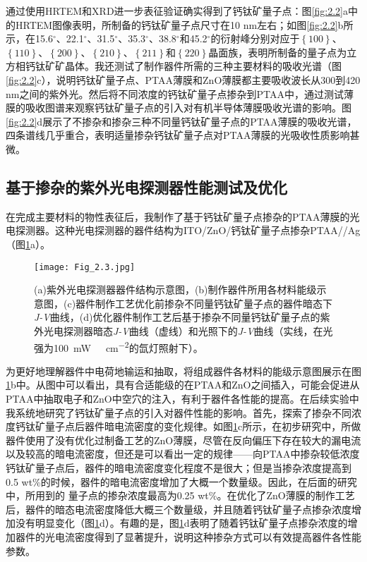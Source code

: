 \documentclass[forlib]{WHUMaster}   %
\def\degree{${}^{\circ}$} %
\begin{document}
{通过使用HRTEM和XRD进一步表征验证确实得到了钙钛矿量子点：图\ref{fig:2.2}a中的HRTEM图像表明，所制备的钙钛矿量子点尺寸在10 nm左右；如图\ref{fig:2.2}b所示，在15.6\degree、22.1\degree、31.5\degree、35.3\degree、38.8\degree 和45.2\degree 的衍射峰分别对应于$\left\{\num{100}\right\}$、$\left\{\num{110}\right\}$、$\left\{\num{200}\right\}$、$\left\{\num{210}\right\}$、$\left\{\num{211}\right\}$和$\left\{\num{220}\right\}$晶面族，表明所制备的量子点为立方相钙钛矿矿晶体\cite{RN33}。我还测试了制作器件所需的三种主要材料的吸收光谱（图\ref{fig:2.2}c），说明钙钛矿量子点、PTAA薄膜和ZnO薄膜都主要吸收波长从300到420 nm之间的紫外光。然后将不同浓度的钙钛矿量子点掺杂到PTAA中，通过测试薄膜的吸收图谱来观察钙钛矿量子点的引入对有机半导体薄膜吸收光谱的影响。图\ref{fig:2.2}d展示了不掺杂和掺杂三种不同量钙钛矿量子点的PTAA薄膜的吸收光谱，四条谱线几乎重合，表明适量掺杂钙钛矿量子点对PTAA薄膜的光吸收性质影响甚微。

\subsection{\texorpdfstring{基于掺杂的紫外光电探测器性能测试及优化}{PDFstring}}%

在完成主要材料的物性表征后，我制作了基于钙钛矿量子点掺杂的PTAA薄膜的光电探测器。这种光电探测器的器件结构为ITO/ZnO/钙钛矿量子点掺杂PTAA//Ag（图\ref{fig:2.3}a）。

\begin{figure}[htb]
\centering
  \texttt{[image: Fig\_2.3.jpg]}
  \caption{\rm (a)紫外光电探测器器件结构示意图，(b)制作器件所用各材料能级示意图，(c)器件制作工艺优化前掺杂不同量钙钛矿量子点的器件暗态下\emph{J-V}曲线，(d)优化器件制作工艺后基于掺杂不同量钙钛矿量子点的紫外光电探测器暗态\emph{J-V}曲线（虚线）和光照下的\emph{J-V}曲线（实线，在光强为100\ \si{mW \ cm^{-2}}的氙灯照射下）。}
  \label{fig:2.3}
\end{figure}

为更好地理解器件中电荷地输运和抽取，将组成器件各材料的能级示意图展示在图\ref{fig:2.3}b中。从图中可以看出，具有合适能级的在PTAA和ZnO之间插入，可能会促进从PTAA中抽取电子和ZnO中空穴的注入，有利于器件各性能的提高。在后续实验中我系统地研究了钙钛矿量子点的引入对器件性能的影响。首先，探索了掺杂不同浓度钙钛矿量子点后器件暗电流密度的变化规律。如图\ref{fig:2.3}c所示，在初步研究中，所做器件使用了没有优化过制备工艺的ZnO薄膜，尽管在反向偏压下存在较大的漏电流以及较高的暗电流密度，但还是可以看出一定的规律——向PTAA中掺杂较低浓度钙钛矿量子点后，器件的暗电流密度变化程度不是很大；但是当掺杂浓度提高到0.5 wt\%的时候，器件的暗电流密度增加了大概一个数量级。因此，在后面的研究中，所用到的 量子点的掺杂浓度最高为0.25 wt\%。在优化了ZnO薄膜的制作工艺后，器件的暗态电流密度降低大概三个数量级，并且随着钙钛矿量子点掺杂浓度增加没有明显变化（图\ref{fig:2.3}d）。有趣的是，图\ref{fig:2.3}d表明了随着钙钛矿量子点掺杂浓度的增加器件的光电流密度得到了显著提升，说明这种掺杂方式可以有效提高器件各性能参数。

}
\end{document}
